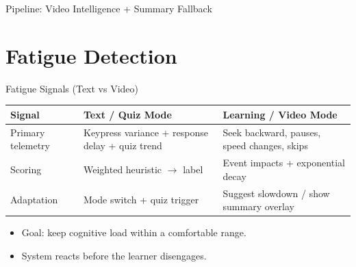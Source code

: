 \documentclass{sdqbeamer}
\begin{document}
\begin{frame}{Pipeline: Video Intelligence + Summary Fallback}
\centering
{}
\end{frame}

\section{Fatigue Detection}

\begin{frame}{Fatigue Signals (Text vs Video)}
\small
\begin{tabularx}{\textwidth}{@{}l X X@{}}
\toprule
\textbf{Signal} & \textbf{Text / Quiz Mode} & \textbf{Learning / Video Mode}\\
\midrule
Primary telemetry & Keypress variance + response delay + quiz trend & Seek backward, pauses, speed changes, skips\\
Scoring & Weighted heuristic $\rightarrow$ label & Event impacts + exponential decay\\
Adaptation & Mode switch + quiz trigger & Suggest slowdown / show summary overlay\\
\bottomrule
\end{tabularx}
\vspace{2mm}

\begin{itemize}
  \item Goal: keep cognitive load within a comfortable range.
  \item System reacts before the learner disengages.
\end{itemize}
\end{frame}
\end{document}
